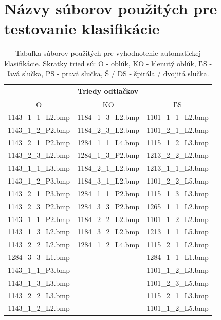 \chapter{Názvy súborov použitých pre testovanie klasifikácie} \label{priloha:zoznam_suborov}
  \begin{table}[ht]
    \centering
    \caption{Tabuľka súborov použitých pre vyhodnotenie automatickej klasifikácie. Skratky tried sú: O - oblúk, KO - klenutý oblúk,
    ĽS - ľavá slučka, PS - pravá sľučka, Š / DS - špirála / dvojitá slučka.}
    \begin{tabular}{ | c | c | c | }
      \hline
      \multicolumn{3}{|c|}{Triedy odtlačkov}            \\
      \hline
      O       & KO        & ĽS \\
      \hline
      1143\_1\_1\_L2.bmp & 1184\_1\_3\_L2.bmp & 1101\_1\_1\_L2.bmp  \\
      1143\_1\_2\_P2.bmp & 1184\_2\_3\_L2.bmp & 1101\_2\_1\_L2.bmp  \\
      1143\_2\_1\_P2.bmp & 1284\_1\_1\_L4.bmp & 1115\_1\_2\_L3.bmp  \\
      1143\_2\_3\_L2.bmp & 1284\_1\_3\_P2.bmp & 1213\_2\_2\_L2.bmp  \\
      1143\_1\_1\_L3.bmp & 1184\_2\_1\_L2.bmp & 1213\_1\_1\_L3.bmp  \\
      1143\_1\_2\_P3.bmp & 1184\_3\_1\_L2.bmp & 1101\_2\_2\_L5.bmp  \\
      1143\_2\_1\_P3.bmp & 1284\_1\_1\_P2.bmp & 1115\_1\_3\_L3.bmp  \\
      1143\_2\_3\_P2.bmp & 1284\_3\_3\_P2.bmp & 1265\_1\_1\_L2.bmp  \\
      1143\_1\_1\_P2.bmp & 1184\_2\_2\_L2.bmp & 1101\_1\_2\_L2.bmp  \\
      1143\_1\_3\_L2.bmp & 1184\_3\_2\_L2.bmp & 1213\_1\_1\_L5.bmp  \\
      1143\_2\_2\_L2.bmp & 1284\_1\_2\_L4.bmp & 1115\_2\_1\_L2.bmp  \\
      1284\_3\_3\_L1.bmp &                 & 1284\_1\_1\_L1.bmp     \\
      1143\_1\_1\_P3.bmp &                 & 1101\_1\_2\_L3.bmp     \\
      1143\_1\_3\_L3.bmp &                 & 1101\_2\_3\_L5.bmp     \\
      1143\_2\_2\_L3.bmp &                 & 1115\_2\_1\_L3.bmp     \\
      1143\_1\_2\_L2.bmp &                 & 1101\_1\_2\_L5.bmp     \\

\end{tabular}
\end{table}
